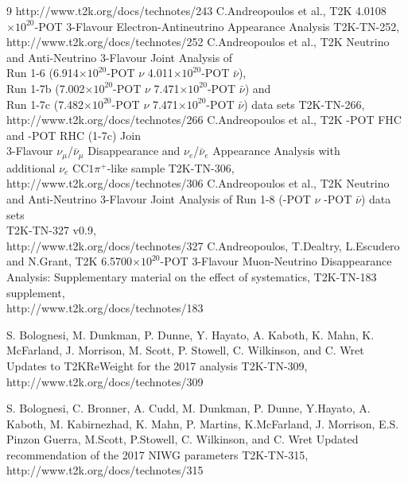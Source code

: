 \begin{thebibliography}{9}
   http://www.t2k.org/docs/technotes/243
   C.Andreopoulos et al.,
   T2K 4.0108$\times10^{20}$-POT 3-Flavour Electron-Antineutrino Appearance Analysis
   T2K-TN-252,\\
   http://www.t2k.org/docs/technotes/252
   C.Andreopoulos et al.,
   T2K Neutrino and Anti-Neutrino 3-Flavour Joint Analysis of  \\
   Run 1-6  (6.914$\times10^{20}$-POT $\nu$ 4.011$\times10^{20}$-POT $\bar{\nu}$), \\
   Run 1-7b (7.002$\times10^{20}$-POT $\nu$ 7.471$\times10^{20}$-POT $\bar{\nu}$) and \\
   Run 1-7c (7.482$\times10^{20}$-POT $\nu$ 7.471$\times10^{20}$-POT $\bar{\nu}$)
   data sets
   T2K-TN-266,\\
   http://www.t2k.org/docs/technotes/266
   C.Andreopoulos et al.,
   T2K \TotalPotNuRunOneSevenC-POT FHC and \TotalPotNuBarRunOneSevenC-POT RHC (1-7c) Join \\
   3-Flavour $\nu_\mu$/$\bar{\nu}_\mu$ Disappearance and $\nu_e$/$\bar{\nu}_e$ Appearance Analysis with \\
   additional $\nu_e$ CC$1\pi^{+}$-like sample
   T2K-TN-306,\\
   http://www.t2k.org/docs/technotes/306
   C.Andreopoulos et al.,
   T2K Neutrino and Anti-Neutrino 3-Flavour Joint Analysis of Run 1-8 (\TotalPotNuRunOneEight-POT $\nu$ \TotalPotNuBarRunOneEight-POT $\bar{\nu}$) data sets \\
   T2K-TN-327 v0.9,\\
   http://www.t2k.org/docs/technotes/327
%
%
  C.Andreopoulos, T.Dealtry, L.Escudero and N.Grant,
  T2K 6.5700$\times10^{20}$-POT 3-Flavour Muon-Neutrino Disappearance Analysis:
  Supplementary material on the effect of systematics,
  T2K-TN-183 supplement,\\
  http://www.t2k.org/docs/technotes/183

  S. Bolognesi, M. Dunkman, P. Dunne, Y. Hayato, A. Kaboth, K. Mahn, K. McFarland, J. Morrison, M. Scott, P. Stowell, C. Wilkinson, and C. Wret
  Updates to T2KReWeight for the 2017 analysis
  T2K-TN-309,\\
  http://www.t2k.org/docs/technotes/309

  S. Bolognesi, C. Bronner, A. Cudd, M. Dunkman, P. Dunne, Y.Hayato, A. Kaboth, M. Kabirnezhad, K. Mahn, P. Martins, K.McFarland, J. Morrison, E.S. Pinzon Guerra, M.Scott, P.Stowell, C. Wilkinson, and C. Wret
  Updated recommendation of the 2017 NIWG parameters
  T2K-TN-315,\\
  http://www.t2k.org/docs/technotes/315


\end{thebibliography}

